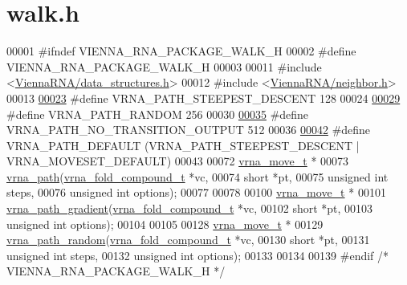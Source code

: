 \hypertarget{walk_8h_source}{}\section{walk.\+h}
\label{walk_8h_source}

\begin{DoxyCode}
00001 \textcolor{preprocessor}{#ifndef VIENNA\_RNA\_PACKAGE\_WALK\_H}
00002 \textcolor{preprocessor}{#define VIENNA\_RNA\_PACKAGE\_WALK\_H}
00003 
00011 \textcolor{preprocessor}{#include <\hyperlink{data__structures_8h}{ViennaRNA/data\_structures.h}>}
00012 \textcolor{preprocessor}{#include <\hyperlink{neighbor_8h}{ViennaRNA/neighbor.h}>}
00013 
\hyperlink{group__paths_ga705cea2b3243a38a2d6e3b1e141ed061}{00023} \textcolor{preprocessor}{#define  VRNA\_PATH\_STEEPEST\_DESCENT 128}
00024 
\hyperlink{group__paths_ga0b84bd36bfd783130297797c51dd85ae}{00029} \textcolor{preprocessor}{#define  VRNA\_PATH\_RANDOM           256}
00030 
\hyperlink{group__paths_ga1ee63e54ecf136491e12ff03ede2622d}{00035} \textcolor{preprocessor}{#define  VRNA\_PATH\_NO\_TRANSITION\_OUTPUT          512}
00036 
\hyperlink{group__paths_gaf1bb1f8fec8d24e3b821f621b19f77b4}{00042} \textcolor{preprocessor}{#define VRNA\_PATH\_DEFAULT   (VRNA\_PATH\_STEEPEST\_DESCENT | VRNA\_MOVESET\_DEFAULT)}
00043 
00072 \hyperlink{group__neighbors_structvrna__move__s}{vrna\_move\_t} *
00073 \hyperlink{group__paths_gab6aee4143f8b103518d5cbfe6bfe5eae}{vrna\_path}(\hyperlink{group__fold__compound_structvrna__fc__s}{vrna\_fold\_compound\_t}  *vc,
00074           \textcolor{keywordtype}{short}                 *pt,
00075           \textcolor{keywordtype}{unsigned} \textcolor{keywordtype}{int}          steps,
00076           \textcolor{keywordtype}{unsigned} \textcolor{keywordtype}{int}          options);
00077 
00078 
00100 \hyperlink{group__neighbors_structvrna__move__s}{vrna\_move\_t} *
00101 \hyperlink{group__paths_gae92cce443a8a64f7b7fb89867b7d6125}{vrna\_path\_gradient}(\hyperlink{group__fold__compound_structvrna__fc__s}{vrna\_fold\_compound\_t} *vc,
00102                    \textcolor{keywordtype}{short}                *pt,
00103                    \textcolor{keywordtype}{unsigned} \textcolor{keywordtype}{int}         options);
00104 
00105 
00128 \hyperlink{group__neighbors_structvrna__move__s}{vrna\_move\_t} *
00129 \hyperlink{group__paths_ga9234756c337078fa599529d3db70d913}{vrna\_path\_random}(\hyperlink{group__fold__compound_structvrna__fc__s}{vrna\_fold\_compound\_t} *vc,
00130                  \textcolor{keywordtype}{short}                *pt,
00131                  \textcolor{keywordtype}{unsigned} \textcolor{keywordtype}{int}         steps,
00132                  \textcolor{keywordtype}{unsigned} \textcolor{keywordtype}{int}         options);
00133 
00134 
00139 \textcolor{preprocessor}{#endif }\textcolor{comment}{/* VIENNA\_RNA\_PACKAGE\_WALK\_H */}\textcolor{preprocessor}{}
\end{DoxyCode}

